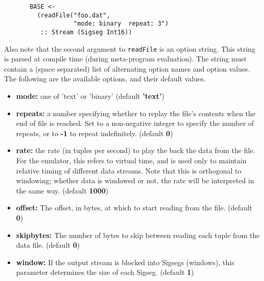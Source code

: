 \documentclass[twocolumn]{report}
\begin{document}
\begin{verbatim}
       BASE <- 
         (readFile("foo.dat", 
                   "mode: binary  repeat: 3")
          :: Stream (Sigseg Int16))
\end{verbatim}

Also note that the second argument to {\tt readFile} is an option
string.  This string is parsed at compile time (during meta-program
evaluation).  The string must contain a (space separated) list of
alternating option names and option values.  The following are the
available options, and their default values.

\begin{itemize}
\item {\bf mode:} one of 'text' or 'binary' (default {\bf 'text'})

\item {\bf repeats:} a number specifying whether to replay the file's
  contents when the end of file is reached.  Set to a non-negative
  integer to specify the number of repeats, or to {\bf -1} to repeat
  indefinitely.  (default {\bf 0})

\item {\bf rate:} the rate (in tuples per second) to play the back the
  data from the file.  For the emulator, this refers to virtual time,
  and is used only to maintain relative timing of different data
  streams.  Note that this is orthogonal to windowing; whether data is
  windowed or not, the rate will be interpreted in the same
  way. (default {\bf 1000}) 

\item {\bf offset:}
  The offset, in bytes, at which to start reading from the
  file. (default {\bf 0})

\item {\bf skipbytes:}
The number of bytes to skip between reading each tuple
  from the data file. (default {\bf 0})

\item {\bf window:} If the output stream is blocked into Sigsegs
  (windows), this parameter determines the size of each
  Sigseg. (default {\bf 1})

\end{itemize}


\end{document}
